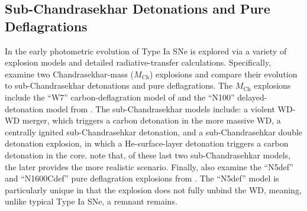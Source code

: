 \documentclass[twocolumn]{aastex61}
\begin{document}
\subsection{Sub-Chandrasekhar Detonations and Pure Deflagrations}

In \citet{2017MNRAS.472.2787N} the early photometric evolution of Type
Ia SNe is explored via a variety of explosion models and detailed
radiative-transfer calculations. Specifically, \citet{2017MNRAS.472.2787N}
examine two Chandrasekhar-mass ($M_\mathrm{Ch}$) explosions and compare their
evolution to sub-Chandrasekhar detonations and pure deflagrations. The
$M_\mathrm{Ch}$ explosions include the ``W7'' carbon-deflagration model of
\citet{1984ApJ...286..644N} and the ``N100'' delayed-detonation model from
\citet{2013MNRAS.429.1156S}. The sub-Chandrasekhar models include: a violent
WD-WD merger, which triggers a carbon detonation in the more massive WD, a
centrally ignited sub-Chandrasehkar detonation, and a sub-Chandrasehkar double
detonation explosion, in which a He-surface-layer detonation triggers a carbon
detonation in the core. \citet{2017MNRAS.472.2787N} note that, of these last
two sub-Chandrasehkar models, the later provides the more realistic scenario.
Finally, \citeauthor{2017MNRAS.472.2787N} also examine the ``N5def'' and
``N1600Cdef'' pure deflagration explosions from \citet{2014MNRAS.438.1762F}.
The ``N5def'' model is particularly unique in that the explosion does not
fully unbind the WD, meaning, unlike typical Type Ia SNe, a remnant remains.
\end{document}
